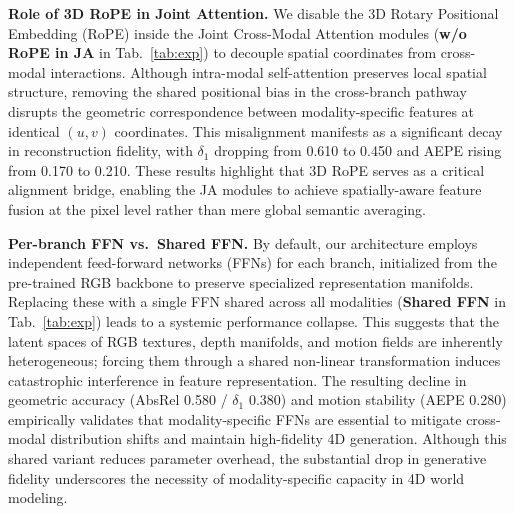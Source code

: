 \noindent 
\textbf{Role of 3D RoPE in Joint Attention.}
We disable the 3D Rotary Positional Embedding (RoPE) inside the Joint Cross-Modal Attention modules (\textbf{w/o RoPE in JA} in Tab.~\ref{tab:exp}) to decouple spatial coordinates from cross-modal interactions. Although intra-modal self-attention preserves local spatial structure, removing the shared positional bias in the cross-branch pathway disrupts the geometric correspondence between modality-specific features at identical $(u,v)$ coordinates. This misalignment manifests as a significant decay in reconstruction fidelity, with $\delta_1$ dropping from 0.610 to 0.450 and AEPE rising from 0.170 to 0.210. These results highlight that 3D RoPE serves as a critical alignment bridge, enabling the JA modules to achieve spatially-aware feature fusion at the pixel level rather than mere global semantic averaging.

\noindent 
\textbf{Per-branch FFN vs.\ Shared FFN.}
By default, our architecture employs independent feed-forward networks (FFNs) for each branch, initialized from the pre-trained RGB backbone to preserve specialized representation manifolds. Replacing these with a single FFN shared across all modalities (\textbf{Shared FFN} in Tab.~\ref{tab:exp}) leads to a systemic performance collapse. This suggests that the latent spaces of RGB textures, depth manifolds, and motion fields are inherently heterogeneous; forcing them through a shared non-linear transformation induces catastrophic interference in feature representation. The resulting decline in geometric accuracy (AbsRel 0.580 / $\delta_1$ 0.380) and motion stability (AEPE 0.280) empirically validates that modality-specific FFNs are essential to mitigate cross-modal distribution shifts and maintain high-fidelity 4D generation. Although this shared variant reduces parameter overhead, the substantial drop in generative fidelity underscores the necessity of modality-specific capacity in 4D world modeling.

